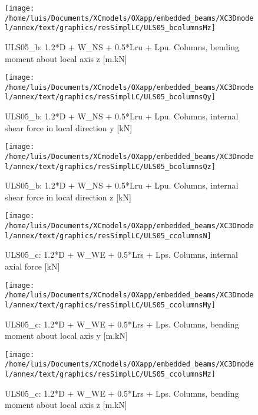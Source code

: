 \begin{figure}
\begin{center}
\texttt{[image: /home/luis/Documents/XCmodels/OXapp/embedded\_beams/XC3Dmodel/annex/text/graphics/resSimplLC/ULS05\_bcolumnsMz]}
\caption{ULS05_b: 1.2*D + W_NS + 0.5*Lru + Lpu. Columns, bending moment about local axis z [m.kN]}
\end{center}
\end{figure}
\begin{figure}
\begin{center}
\texttt{[image: /home/luis/Documents/XCmodels/OXapp/embedded\_beams/XC3Dmodel/annex/text/graphics/resSimplLC/ULS05\_bcolumnsQy]}
\caption{ULS05_b: 1.2*D + W_NS + 0.5*Lru + Lpu. Columns, internal shear force in local direction y [kN]}
\end{center}
\end{figure}
\begin{figure}
\begin{center}
\texttt{[image: /home/luis/Documents/XCmodels/OXapp/embedded\_beams/XC3Dmodel/annex/text/graphics/resSimplLC/ULS05\_bcolumnsQz]}
\caption{ULS05_b: 1.2*D + W_NS + 0.5*Lru + Lpu. Columns, internal shear force in local direction z [kN]}
\end{center}
\end{figure}
\clearpage
\begin{figure}
\begin{center}
\texttt{[image: /home/luis/Documents/XCmodels/OXapp/embedded\_beams/XC3Dmodel/annex/text/graphics/resSimplLC/ULS05\_ccolumnsN]}
\caption{ULS05_c: 1.2*D + W_WE + 0.5*Lrs + Lps. Columns, internal axial force [kN]}
\end{center}
\end{figure}
\begin{figure}
\begin{center}
\texttt{[image: /home/luis/Documents/XCmodels/OXapp/embedded\_beams/XC3Dmodel/annex/text/graphics/resSimplLC/ULS05\_ccolumnsMy]}
\caption{ULS05_c: 1.2*D + W_WE + 0.5*Lrs + Lps. Columns, bending moment about local axis y [m.kN]}
\end{center}
\end{figure}
\begin{figure}
\begin{center}
\texttt{[image: /home/luis/Documents/XCmodels/OXapp/embedded\_beams/XC3Dmodel/annex/text/graphics/resSimplLC/ULS05\_ccolumnsMz]}
\caption{ULS05_c: 1.2*D + W_WE + 0.5*Lrs + Lps. Columns, bending moment about local axis z [m.kN]}
\end{center}
\end{figure}
